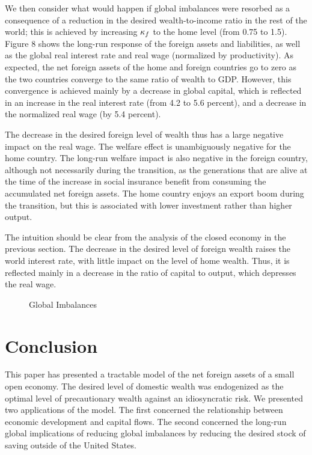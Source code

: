 \documentclass[titlepage,abstract,letterpaper]{econtex}
\begin{document}
We then consider what would happen if global imbalances were resorbed
as a consequence of a reduction in the desired wealth-to-income ratio in the rest of the
world; this is achieved by increasing $\kappa_f$ to the home level (from 0.75 to
1.5). Figure 8 shows the long-run response of the foreign assets and
liabilities, as well as the global real interest rate and real wage
(normalized by productivity). As expected, the net foreign assets of
the home and foreign countries go to zero as the two countries
converge to the same ratio of wealth to GDP. However, this convergence
is achieved mainly by a decrease in global capital, which is reflected
in an increase in the real interest rate (from 4.2 to 5.6 percent),
and a decrease in the normalized real wage (by 5.4 percent).

The decrease in the desired foreign level of wealth thus has a large negative impact on the real wage. The welfare effect is unambiguously negative for the home country. The long-run welfare impact is also negative in the foreign country, although not necessarily during the transition, as the generations that are alive at the time of the increase in social insurance benefit from consuming the accumulated net foreign assets. The home country enjoys an export boom during the transition, but this is associated with lower investment rather than higher output.

The intuition should be clear from the analysis of the closed economy in the previous section. The decrease in the desired level of foreign wealth raises the world interest rate, with little impact on the level of home wealth. Thus, it is reflected mainly in a decrease in the ratio of capital to output, which depresses the real wage.

\medskip
\begin{figure}
\caption{Global Imbalances}\label{fig:globImb}
\end{figure}
\medskip

\section{Conclusion}

This paper has presented a tractable model of the net foreign assets
of a small open economy. The desired level of domestic wealth was
endogenized as the optimal level of precautionary wealth against an
idiosyncratic risk. We presented two applications of the model. The
first concerned the relationship between economic development and
capital flows.  The second concerned the long-run global implications
of reducing global imbalances by reducing the desired stock of saving
outside of the United States.
\end{document}
